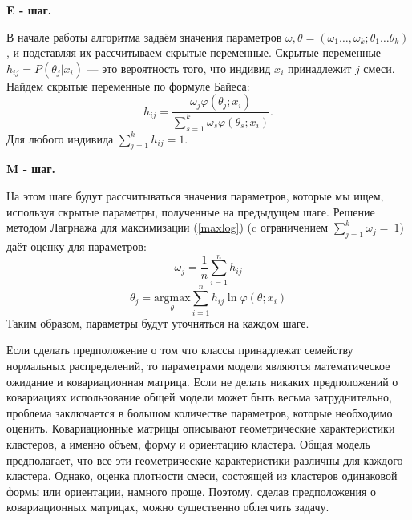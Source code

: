 \documentclass[article, 10pt]{disser}
\begin{document}
\textbf{E - шаг.}

В начале работы алгоритма задаём значения параметров $\omega, \theta = (\omega_{1}\ldots, \omega_{k};\theta_{1}\ldots \theta_{k})$, и подставляя их рассчитываем скрытые переменные. Скрытые переменные $h_{ij} = P(\theta_{j}|x_{i})$ --- это вероятность того, что индивид $x_{i}$ принадлежит $j$ смеси. Найдем скрытые переменные по формуле Байеса:
\begin{equation}
h_{ij} = \frac{ \omega_{j} \varphi(\theta_{j}; x_{i})}{\sum\limits_{s=1}^k \omega_{s}  \varphi(\theta_{s}; x_{i})}.
\end{equation}
Для любого индивида $\sum\limits_{j=1}^k h_{ij} = 1.$

\textbf{M - шаг.}

На этом шаге будут рассчитываться значения параметров, которые мы ищем, используя скрытые параметры, полученные на предыдущем шаге. Решение методом Лагрнажа для максимизации (\ref{maxlog}) (c ограничением $\sum\limits_{j=1}^k\omega_{j}=~1$) даёт оценку для параметров:
\begin{equation}
\omega_{j} = \frac{1}{n} \sum\limits_{i=1}^n h_{ij}
\end{equation}
\begin{equation}
\theta_{j} = \underset{\theta}{\text{argmax}} \sum\limits_{i=1}^n h_{ij} \ln{\varphi(\theta; x_{i})}
\end{equation}
Таким образом, параметры будут уточняться на каждом шаге.

Если сделать предположение о том что классы принадлежат семейству нормальных распределений, то параметрами модели являются математическое ожидание и ковариационная матрица. Если не делать никаких предположений о ковариациях использование общей модели может быть весьма затруднительно, проблема заключается в большом количестве параметров, которые необходимо оценить. Ковариационные матрицы описывают геометрические характеристики кластеров, а именно объем, форму и ориентацию кластера. Общая модель предполагает, что все эти геометрические характеристики различны для каждого кластера. Однако, оценка плотности смеси, состоящей из кластеров одинаковой формы или ориентации, намного проще. Поэтому, сделав предположения о ковариационных матрицах, можно существенно облегчить задачу.
\end{document}
